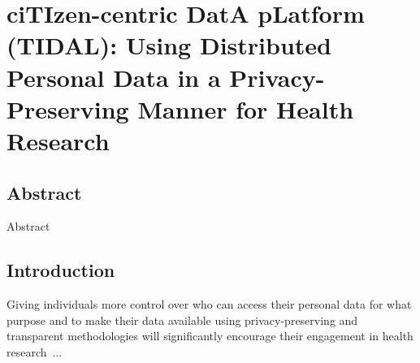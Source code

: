 \lstset{style=mystyle, columns=fullflexible}


\newcommand{\tidal}{TIDAL}
\chapter{ciTIzen-centric DatA pLatform (\tidal): Using Distributed Personal Data in a Privacy-Preserving Manner for Health Research}
\papercitationChaSeven
\begin{refsection}

\clearpage

\section*{Abstract}Abstract
\clearpage

\section{Introduction}
\label{sec:introduction}
Giving individuals more control over who can access their personal data for what purpose and to make their data available using privacy-preserving and transparent methodologies will significantly encourage their engagement in health research~\cite{chen2016personalized,hulsen2020sharing}...

\printbibliography[heading=subbibintoc]
\end{refsection}